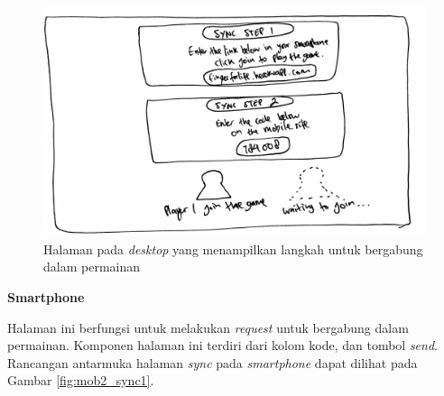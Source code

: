 \begin{enumerate}
\begin{figure}[H]
	\centering
	\includegraphics[scale=0.1]{Gambar/web2_sync}
	\caption{Halaman pada \textit{desktop} yang menampilkan langkah untuk bergabung dalam permainan}
	\label{fig:web2_sync}
\end{figure}

	\textbf{Smartphone}
	
	Halaman ini berfungsi untuk melakukan \textit{request} untuk bergabung dalam permainan. Komponen halaman ini terdiri dari kolom kode, dan tombol \textit{send}. Rancangan antarmuka halaman \textit{sync} pada \textit{smartphone} dapat dilihat pada Gambar \ref{fig:mob2_sync1}.
	

\end{enumerate}
